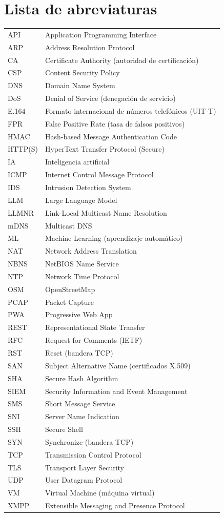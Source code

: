 \chapter*{Lista de abreviaturas}
\thispagestyle{plain}
\begin{longtable}{@{}p{2.2cm}l@{}}
API & Application Programming Interface\\
ARP & Address Resolution Protocol\\
CA & Certificate Authority (autoridad de certificación)\\
CSP & Content Security Policy\\
DNS & Domain Name System\\
DoS & Denial of Service (denegación de servicio)\\
E.164 & Formato internacional de números telefónicos (UIT-T)\\
FPR & False Positive Rate (tasa de falsos positivos)\\
HMAC & Hash-based Message Authentication Code\\
HTTP(S) & HyperText Transfer Protocol (Secure)\\
IA & Inteligencia artificial\\
ICMP & Internet Control Message Protocol\\
IDS & Intrusion Detection System\\
LLM & Large Language Model\\
LLMNR & Link-Local Multicast Name Resolution\\
mDNS & Multicast DNS\\
ML & Machine Learning (aprendizaje automático)\\
NAT & Network Address Translation\\
NBNS & NetBIOS Name Service\\
NTP & Network Time Protocol\\
OSM & OpenStreetMap\\
PCAP & Packet Capture\\
PWA & Progressive Web App\\
REST & Representational State Transfer\\
RFC & Request for Comments (IETF)\\
RST & Reset (bandera TCP)\\
SAN & Subject Alternative Name (certificados X.509)\\
SHA & Secure Hash Algorithm\\
SIEM & Security Information and Event Management\\
SMS & Short Message Service\\
SNI & Server Name Indication\\
SSH & Secure Shell\\
SYN & Synchronize (bandera TCP)\\
TCP & Transmission Control Protocol\\
TLS & Transport Layer Security\\
UDP & User Datagram Protocol\\
VM & Virtual Machine (máquina virtual)\\
XMPP & Extensible Messaging and Presence Protocol\\
\end{longtable}
